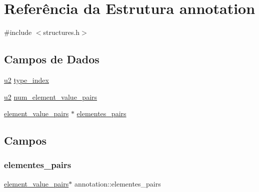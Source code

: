 \hypertarget{structannotation}{}\section{Referência da Estrutura annotation}
\label{structannotation}


{\ttfamily \#include $<$structures.\+h$>$}

\subsection*{Campos de Dados}
\begin{DoxyCompactItemize}
\item 
\hyperlink{lista__operandos_8h_a732cde1300aafb73b0ea6c2558a7a54f}{u2} \hyperlink{structannotation_ac1579f92b65639fa8646311a2520e58c}{type\+\_\+index}
\item 
\hyperlink{lista__operandos_8h_a732cde1300aafb73b0ea6c2558a7a54f}{u2} \hyperlink{structannotation_a5f584027263eca714f8ee8fc02fcc2ac}{num\+\_\+element\+\_\+value\+\_\+pairs}
\item 
\hyperlink{structelement__value__pairs}{element\+\_\+value\+\_\+pairs} $\ast$ \hyperlink{structannotation_a4b33f66e2657ea077cec0392e82a0ce5}{elementes\+\_\+pairs}
\end{DoxyCompactItemize}


\subsection{Campos}
\mbox{\label{structannotation_a4b33f66e2657ea077cec0392e82a0ce5}} 
\subsubsection{\texorpdfstring{elementes\+\_\+pairs}{elementes\_pairs}}
{\footnotesize\ttfamily \hyperlink{structelement__value__pairs}{element\+\_\+value\+\_\+pairs}$\ast$ annotation\+::elementes\+\_\+pairs}

\mbox{\label{structannotation_a5f584027263eca714f8ee8fc02fcc2ac}} 
